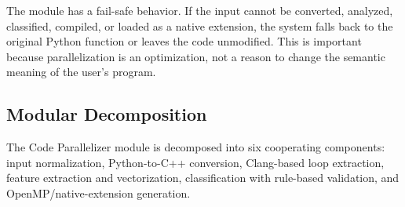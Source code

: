 The module has a fail-safe behavior. If the input cannot be converted, analyzed,
classified, compiled, or loaded as a native extension, the system falls back to
the original Python function or leaves the code unmodified. This is important
because parallelization is an optimization, not a reason to change the semantic
meaning of the user's program.

\subsection{Modular Decomposition}

The Code Parallelizer module is decomposed into six cooperating components:
input normalization, Python-to-C++ conversion, Clang-based loop extraction,
feature extraction and vectorization, classification with rule-based validation,
and OpenMP/native-extension generation.

